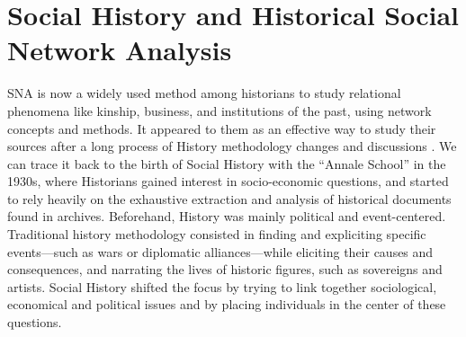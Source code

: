 

\section{Social History and Historical Social Network Analysis}

SNA is now a widely used method among historians to study relational phenomena like kinship, business, and institutions of the past, using network concepts and methods.
It appeared to them as an effective way to study their sources after a long process of History methodology changes and discussions \cite{prost2014}.
We can trace it back to the birth of Social History with the ``Annale School'' in the 1930s, where Historians gained interest in socio-economic questions, and started to rely heavily on the exhaustive extraction and analysis of historical documents found in archives.
Beforehand, History was mainly political and event-centered.
Traditional history methodology consisted in finding and expliciting specific events---such as wars or diplomatic alliances---while eliciting their causes and consequences, and narrating the lives of historic figures, such as sovereigns and artists.
Social History shifted the focus by trying to link together sociological, economical and political issues and by placing individuals in the center of these questions.

